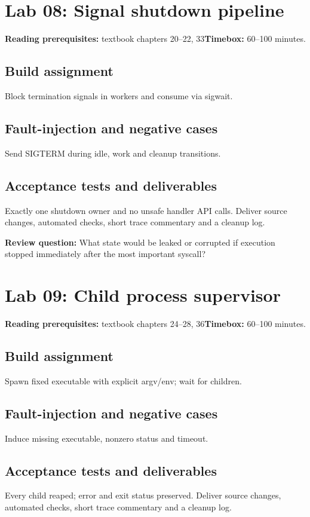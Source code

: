 \documentclass[11pt,letterpaper,oneside]{report}
\begin{document}
\section{Lab 08: Signal shutdown pipeline}
\textbf{Reading prerequisites:} textbook chapters 20--22, 33\quad \textbf{Timebox:} 60--100 minutes.

\subsection{Build assignment}
Block termination signals in workers and consume via sigwait.

\subsection{Fault-injection and negative cases}
Send SIGTERM during idle, work and cleanup transitions.

\subsection{Acceptance tests and deliverables}
Exactly one shutdown owner and no unsafe handler API calls. Deliver source changes, automated checks, short trace commentary and a cleanup log.

\textbf{Review question:} What state would be leaked or corrupted if execution stopped immediately after the most important syscall?

\section{Lab 09: Child process supervisor}
\textbf{Reading prerequisites:} textbook chapters 24--28, 36\quad \textbf{Timebox:} 60--100 minutes.

\subsection{Build assignment}
Spawn fixed executable with explicit argv/env; wait for children.

\subsection{Fault-injection and negative cases}
Induce missing executable, nonzero status and timeout.

\subsection{Acceptance tests and deliverables}
Every child reaped; error and exit status preserved. Deliver source changes, automated checks, short trace commentary and a cleanup log.
\end{document}
